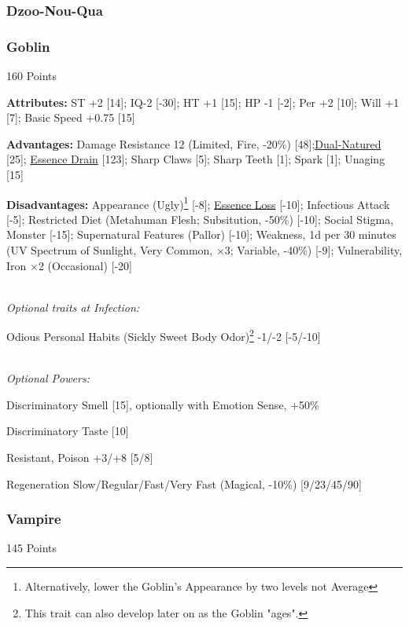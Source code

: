 \begin{multicols*}{3}
	\subsubsection{Dzoo-Nou-Qua}

	\subsubsection{Goblin}
	\begin{flushright}
		160 Points
	\end{flushright}

	\textbf{Attributes:}
	ST +2 [14]; IQ-2 [-30]; HT +1 [15]; HP -1 [-2]; Per +2 [10]; Will +1 [7]; Basic Speed +0.75 [15]
	
	\textbf{Advantages:}
	Damage Resistance 12 (Limited, Fire, -20\%) [48];\hyperref[dual_natured]{Dual-Natured} [25];  \hyperref[essence_drain]{Essence Drain} [123]; Sharp Claws [5]; Sharp Teeth [1]; Spark [1]; Unaging [15]
	
	\textbf{Disadvantages:}	
	Appearance (Ugly)\footnote{Alternatively, lower the Goblin's Appearance by two levels not Average} [-8]; \hyperref[essence_loss]{Essence Loss} [-10]; Infectious Attack [-5]; Restricted Diet (Metahuman Flesh; Subsitution, -50\%) [-10]; Social Stigma, Monster [-15]; Supernatural Features (Pallor) [-10]; Weakness, 1d per 30 minutes (UV Spectrum of Sunlight, Very Common, $\times$3; Variable, -40\%) [-9]; Vulnerability, Iron  $\times$2 (Occasional) [-20]
		
		
	\textit{\\Optional traits at Infection:}
	
	Odious Personal Habits (Sickly Sweet Body Odor)\footnote{This trait can also develop later on as the Goblin "ages".} -1/-2 [-5/-10]
		
	\textit{\\Optional Powers:}
		
	Discriminatory Smell [15], optionally with Emotion Sense, +50\%
	
	Discriminatory Taste [10]
		
	Resistant, Poison +3/+8 [5/8]
	
	Regeneration Slow/Regular/Fast/Very Fast (Magical, -10\%) [9/23/45/90]
		
	\subsubsection{Vampire}
	\begin{flushright}
		145 Points
	\end{flushright}
	

\end{multicols*}
